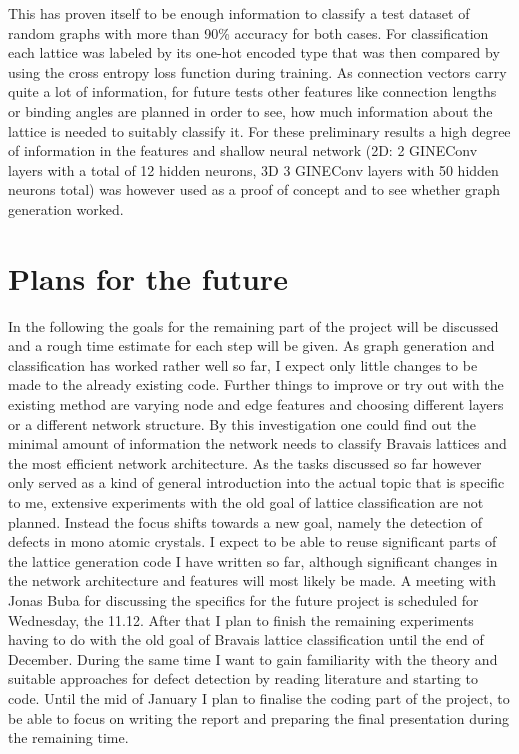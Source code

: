 \documentclass[11pt,a4paper]{article}
\begin{document}
This has proven itself to be enough information to classify a test dataset of random graphs with more than 90\% accuracy for both cases. 
For classification each lattice was labeled by its one-hot encoded type that was then compared by using the  cross entropy loss function during training. 
As connection vectors carry quite a lot of information, for future tests other features like connection lengths or binding angles are planned in order to see, how much information about the lattice is needed to suitably classify it. 
For these preliminary results a high degree of information in the features and shallow neural network (2D: 2 GINEConv layers \cite{pygteamGINEConv2024} with a total of 12 hidden neurons, 3D 3 GINEConv layers with 50 hidden neurons total) was however used as a proof of concept and to see whether graph generation worked. 



\section{Plans for the future}
\label{sec:Plans for the future}
In the following the goals for the remaining part of the project will be discussed and a rough time estimate for each step will be given. 
As graph generation and classification has worked rather well so far, I expect only little changes to be made to the already existing code. 
Further things to improve or try out with the existing method are varying node and edge features and choosing different layers or a different network structure. 
By this investigation one could find out the minimal amount of information the network needs to classify Bravais lattices and the most efficient network architecture. 
As the tasks discussed so far however only served as a kind of general introduction into the actual topic that is specific to me, extensive experiments with the old goal of lattice classification are not planned. 
Instead the focus shifts towards a new goal, namely the detection of defects in mono atomic crystals. 
I expect to be able to reuse significant parts of the lattice generation code I have written so far, although significant changes in the network architecture and features will most likely be made. 
A meeting with Jonas Buba for discussing the specifics for the future project is scheduled for Wednesday, the 11.12. 
After that I plan to finish the remaining experiments having to do with the old goal of Bravais lattice classification until the end of December. 
During the same time I want to gain familiarity with the theory and suitable approaches for defect detection by reading literature and starting to code. 
Until the mid of January I plan to finalise the coding part of the project, to be able to focus on writing the report and preparing the final presentation during the remaining time. 
\end{document}
